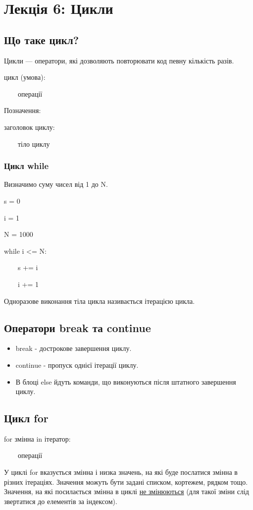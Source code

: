 \section{Лекція 6: Цикли}
 
 \subsection{Що таке цикл?} 
\begin{frame}
Цикли — оператори, які дозволяють повторювати код певну кількість разів.

\huge{цикл (умова):

~~~~операції
}

\normalsize Позначення:

\large{заголовок циклу:

~~~~тіло циклу
}


\end{frame}

\begin{frame}
\frametitle{Цикл while}
Визначимо суму чисел від 1 до N.

s = 0

i = 1 

N = 1000

while i <= N:

~~~~s += i

~~~~i += 1

Одноразове виконання тіла цикла називається ітерацією цикла.

\end{frame}

 \subsection{Оператори break та continue} 
\begin{frame}
\begin{itemize}
  \item break - дострокове завершення циклу.
  \item continue - пропуск однієї ітерації циклу.
  \item В блоці else йдуть команди, що виконуються після штатного завершення циклу.
\end{itemize}
\end{frame}

 \subsection{Цикл for} 
\begin{frame}
\huge{for змінна in ітератор:

~~~~операції
}

\vspace{1cm}
\normalsize 
У циклі for вказується змінна і низка значень, на які буде послатися змінна в різних ітераціях. Значення можуть бути задані списком, кортежем, рядком тощо. Значення, на які посилається змінна в циклі \underline{не змінюються} (для такої зміни слід звертатися до елементів за індексом).

\end{frame}

